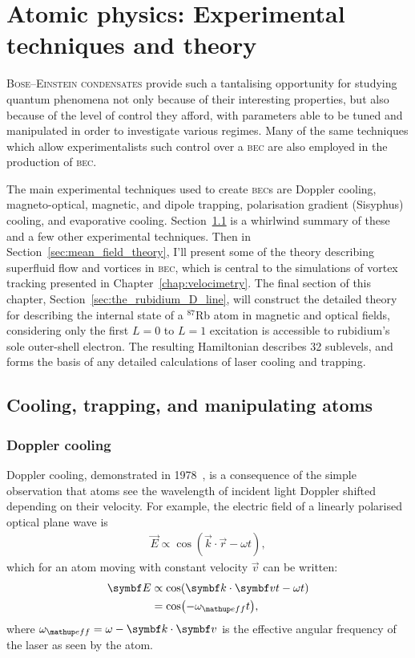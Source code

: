 \chapter{Atomic physics: Experimental techniques and theory}\label{chap:atomic_physics}

\lettrine[lines=3]{B}{ose--Einstein condensates} provide such a tantalising opportunity for studying quantum phenomena not only because of their interesting properties, but also because of the level of control they afford, with parameters able to be tuned and manipulated in order to investigate various regimes. Many of the same techniques which allow experimentalists such control over a \textsc{bec} are also employed in the production of \textsc{bec}.

The main experimental techniques used to create \textsc{bec}s are Doppler cooling, magneto-optical, magnetic, and dipole trapping, polarisation gradient (Sisyphus) cooling, and evaporative cooling. Section~\ref{sec:cooling_and_trapping} is a whirlwind summary of these and a few other experimental techniques. Then in Section~\ref{sec:mean_field_theory}, I'll present some of the theory describing superfluid flow and vortices in \textsc{bec}, which is central to the simulations of vortex tracking presented in Chapter~\ref{chap:velocimetry}. The final section of this chapter, Section~\ref{sec:the_rubidium_D_line}, will construct the detailed theory for describing the internal state of a $^{87}$Rb atom in magnetic and optical fields, considering only the first $L=0$ to $L=1$ excitation is accessible to rubidium's  sole outer-shell electron. The resulting Hamiltonian describes 32 sublevels, and forms the basis of any detailed calculations of laser cooling and trapping.

\section{Cooling, trapping, and manipulating atoms}\label{sec:cooling_and_trapping}

\subsection{Doppler cooling}\label{sec:doppler_cooling}

Doppler cooling, demonstrated in 1978~\cite{wineland_radiation-pressure_1978}, is a consequence of the simple observation that atoms see the wavelength of incident light Doppler shifted depending on their velocity. For example, the electric field of a linearly polarised optical plane wave is
\begin{align}
\vec E \propto \cos(\vec k \cdot \vec r - \omega t),
\end{align}
which for an atom moving with constant velocity $\vec v$ can be written:
\begin{align}
\vec E &\propto \cos(\vec k \cdot \vec v t - \omega t)\\
&= \cos(- \omega_\up{eff} t),
\end{align}
where $\omega_\up{eff} = \omega - \vec k \cdot \vec v$ is the effective angular frequency of the laser as seen by the atom.

